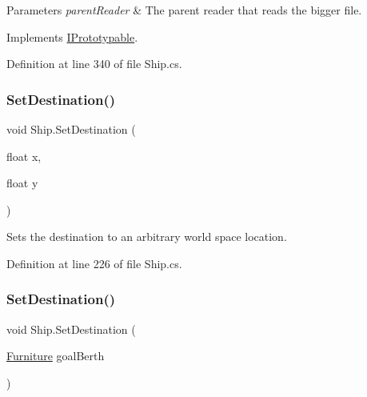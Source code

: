 \begin{DoxyParams}{Parameters}
{\em parent\+Reader} & The parent reader that reads the bigger file.\\
\hline
\end{DoxyParams}


Implements \hyperlink{interface_i_prototypable_a024d752c4be655a7166db5718f1fad6a}{I\+Prototypable}.



Definition at line 340 of file Ship.\+cs.

\mbox{\label{class_ship_a5c5ee984c2e67e8a771ad920ef513818}} 
\subsubsection{\texorpdfstring{Set\+Destination()}{SetDestination()}\hspace{0.1cm}{\footnotesize\ttfamily [1/2]}}
{\footnotesize\ttfamily void Ship.\+Set\+Destination (\begin{DoxyParamCaption}\item[{float}]{x,  }\item[{float}]{y }\end{DoxyParamCaption})}



Sets the destination to an arbitrary world space location. 



Definition at line 226 of file Ship.\+cs.

\mbox{\label{class_ship_a59115e2eaadf1012769b415743f5e549}} 
\subsubsection{\texorpdfstring{Set\+Destination()}{SetDestination()}\hspace{0.1cm}{\footnotesize\ttfamily [2/2]}}
{\footnotesize\ttfamily void Ship.\+Set\+Destination (\begin{DoxyParamCaption}\item[{\hyperlink{class_furniture}{Furniture}}]{goal\+Berth }\end{DoxyParamCaption})}



